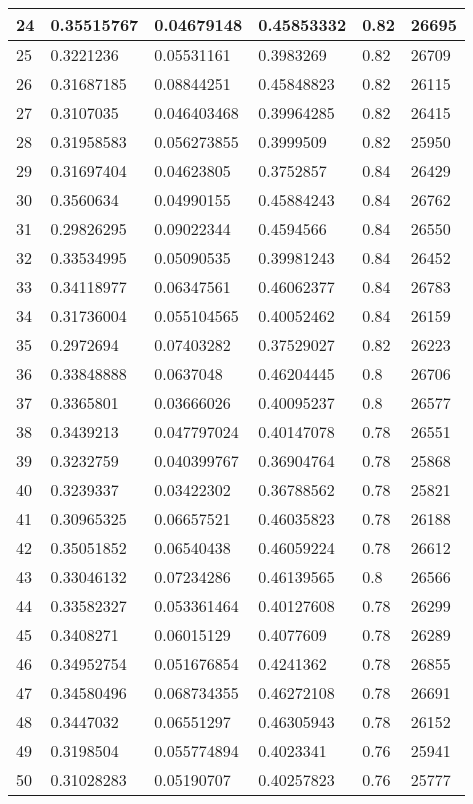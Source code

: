 \begin{longtable}{|l|l|l|l|l|l|}
24 & 0.35515767 & 0.04679148 & 0.45853332 & 0.82 & 26695 \\ \hline 
25 & 0.3221236 & 0.05531161 & 0.3983269 & 0.82 & 26709 \\ \hline 
26 & 0.31687185 & 0.08844251 & 0.45848823 & 0.82 & 26115 \\ \hline 
27 & 0.3107035 & 0.046403468 & 0.39964285 & 0.82 & 26415 \\ \hline 
28 & 0.31958583 & 0.056273855 & 0.3999509 & 0.82 & 25950 \\ \hline 
29 & 0.31697404 & 0.04623805 & 0.3752857 & 0.84 & 26429 \\ \hline 
30 & 0.3560634 & 0.04990155 & 0.45884243 & 0.84 & 26762 \\ \hline 
31 & 0.29826295 & 0.09022344 & 0.4594566 & 0.84 & 26550 \\ \hline 
32 & 0.33534995 & 0.05090535 & 0.39981243 & 0.84 & 26452 \\ \hline 
33 & 0.34118977 & 0.06347561 & 0.46062377 & 0.84 & 26783 \\ \hline 
34 & 0.31736004 & 0.055104565 & 0.40052462 & 0.84 & 26159 \\ \hline 
35 & 0.2972694 & 0.07403282 & 0.37529027 & 0.82 & 26223 \\ \hline 
36 & 0.33848888 & 0.0637048 & 0.46204445 & 0.8 & 26706 \\ \hline 
37 & 0.3365801 & 0.03666026 & 0.40095237 & 0.8 & 26577 \\ \hline 
38 & 0.3439213 & 0.047797024 & 0.40147078 & 0.78 & 26551 \\ \hline 
39 & 0.3232759 & 0.040399767 & 0.36904764 & 0.78 & 25868 \\ \hline 
40 & 0.3239337 & 0.03422302 & 0.36788562 & 0.78 & 25821 \\ \hline 
41 & 0.30965325 & 0.06657521 & 0.46035823 & 0.78 & 26188 \\ \hline 
42 & 0.35051852 & 0.06540438 & 0.46059224 & 0.78 & 26612 \\ \hline 
43 & 0.33046132 & 0.07234286 & 0.46139565 & 0.8 & 26566 \\ \hline 
44 & 0.33582327 & 0.053361464 & 0.40127608 & 0.78 & 26299 \\ \hline 
45 & 0.3408271 & 0.06015129 & 0.4077609 & 0.78 & 26289 \\ \hline 
46 & 0.34952754 & 0.051676854 & 0.4241362 & 0.78 & 26855 \\ \hline 
47 & 0.34580496 & 0.068734355 & 0.46272108 & 0.78 & 26691 \\ \hline 
48 & 0.3447032 & 0.06551297 & 0.46305943 & 0.78 & 26152 \\ \hline 
49 & 0.3198504 & 0.055774894 & 0.4023341 & 0.76 & 25941 \\ \hline 
50 & 0.31028283 & 0.05190707 & 0.40257823 & 0.76 & 25777 \\ \hline 
\end{longtable}